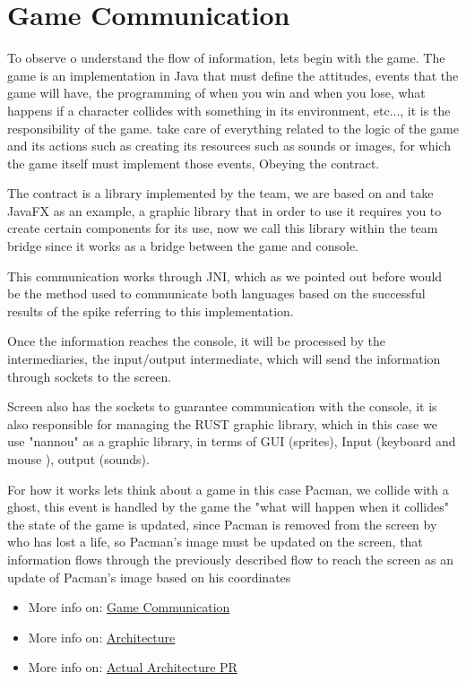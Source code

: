 \documentclass[a4paper,12pt]{article}
\begin{document}
\section{Game Communication}
\setlength{\parskip}{1em}
To observe o understand the flow of information, lets begin with the game.
The game is an implementation in Java that must define the attitudes, events that the game will have, the programming of when you win and when you lose, what happens if a character collides with something in its environment, etc..., it is the responsibility of the game. take care of everything related to the logic of the game and its actions such as creating its resources such as sounds or images, for which the game itself must implement those events, Obeying the contract.


The contract is a library implemented by the team, we are based on and take JavaFX as an example, a graphic library that in order to use it requires you to create certain components for its use, now we call this library within the team bridge since it works as a bridge between the game and console.


This communication works through JNI, which as we pointed out before would be the method used to communicate both languages based on the successful results of the spike referring to this implementation.


Once the information reaches the console, it will be processed by the intermediaries, the input/output intermediate, which will send the information through sockets to the screen.


Screen also has the sockets to guarantee communication with the console, it is also responsible for managing the RUST graphic library, which in this case we use "nannou" as a graphic library, in terms of GUI (sprites), Input (keyboard and mouse ), output (sounds).


For how it works lets think about a game in this case Pacman, we collide with a ghost, this event is handled by the game the "what will happen when it collides" the state of the game is updated, since Pacman is removed from the screen by who has lost a life, so Pacman's image must be updated on the screen, that information flows through the previously described flow to reach the screen as an update of Pacman's image based on his coordinates
\begin{itemize}
    \item More info on:  \href{https://tree.taiga.io/project/joseluis-teran-coffeetime/wiki/game-communication}{Game Communication}
      \item More info on:  \href{https://github.com/Pending-Name-21/arquitecture/blob/main/workspace.dsl}{Architecture} 
      \item More info on:  \href{https://github.com/Pending-Name-21/arquitecture/pull/12}{Actual Architecture PR} 
\end{itemize}
\end{document}
